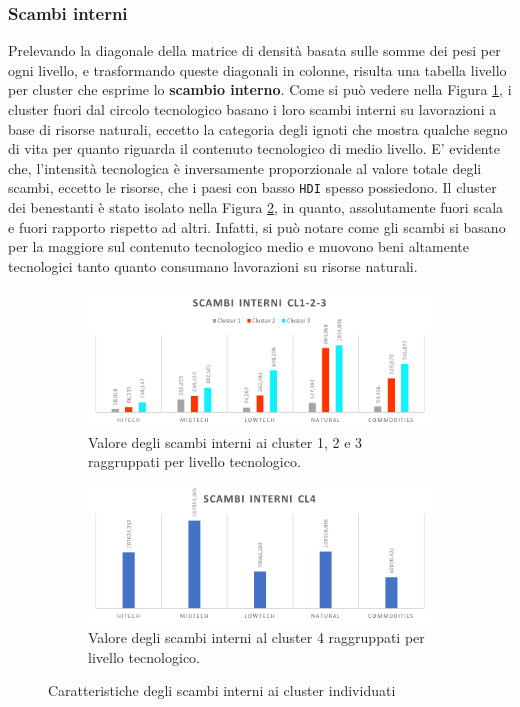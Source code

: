 \documentclass[]{article}
\begin{document}
\begin{multicols}{2}
	\subsubsection{Scambi interni}
	Prelevando la diagonale della matrice di densità basata sulle somme dei pesi per ogni livello, e trasformando queste diagonali in colonne, risulta una tabella livello per cluster che esprime lo \textbf{scambio interno}. Come si può vedere nella Figura \ref{subfig:scambi-cluster123}, i cluster fuori dal circolo tecnologico basano i loro scambi interni su lavorazioni a base di risorse naturali, eccetto la categoria degli ignoti che mostra qualche segno di vita per quanto riguarda il contenuto tecnologico di medio livello. E' evidente che, l'intensità tecnologica è inversamente proporzionale al valore totale degli scambi, eccetto le risorse, che i paesi con basso \texttt{HDI} spesso possiedono. Il cluster dei benestanti è stato isolato nella Figura \ref{subfig:scambi-cluster4}, in quanto, assolutamente fuori scala e fuori rapporto rispetto ad altri. Infatti, si può notare come gli scambi si basano per la maggiore sul contenuto tecnologico medio e muovono beni altamente tecnologici tanto quanto consumano lavorazioni su risorse naturali.
	\begin{figure}[t]
		\centering
		\begin{subfigure}[b]{1\textwidth}
			\includegraphics[width=\textwidth]{img/scambi-cluster123.png}
			\caption{Valore degli scambi interni ai cluster 1, 2 e 3 raggruppati per livello tecnologico.}
			\label{subfig:scambi-cluster123}
		\end{subfigure}
		\begin{subfigure}[b]{1\textwidth}
			\includegraphics[width=\textwidth]{img/scambi-cluster4.png}
			\caption{Valore degli scambi interni al cluster 4 raggruppati per livello tecnologico.}
			\label{subfig:scambi-cluster4}
		\end{subfigure}
		\caption{Caratteristiche degli scambi interni ai cluster individuati}
		\label{fig:scambi}
	\end{figure}


\end{multicols}
\end{document}
